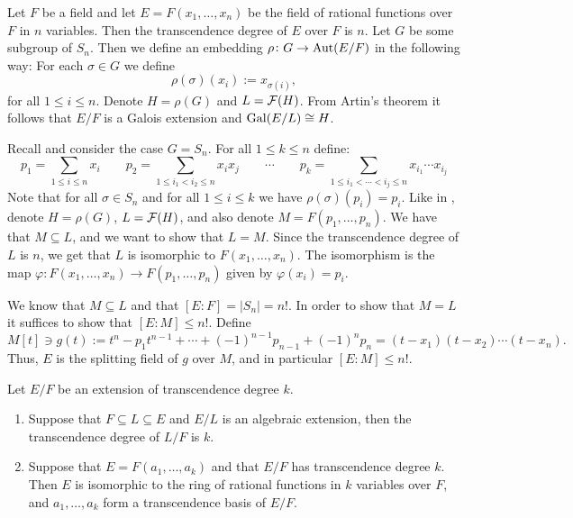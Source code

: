 \documentclass[11pt,a4paper]{article}
\begin{document}
\begin{example}
  \label{exmp:transcendence}
  Let $F$ be a field and let $E = F(x_1,\dots,x_n)$
  be the field of rational functions over $F$ in $n$ variables.
  Then the transcendence degree of $E$ over $F$ is $n$.
  Let $G$ be some subgroup of $S_n$.
  Then we define an embedding $\rho \colon G \to \operatorname{Aut}(E/F)$
  in the following way:
  For each $\sigma \in G$ we define
  \[
    \rho(\sigma)(x_i) := x_{\sigma(i)},
  \]
  for all $1 \le i \le n$.
  Denote $H = \rho(G)$ and $L = \mathcal F(H)$.
  From Artin's theorem it follows that $E/F$ is a Galois extension
  and $\operatorname{Gal}(E/L) \cong H$.
\end{example}

\begin{example}
  Recall 
  and consider the case $G = S_n$.
  For all $1 \le k \le n$ define:
  \[
    p_1 = \sum_{1 \le i \le n} x_i \qquad
    p_2 = \sum_{1 \le i_1 < i_2 \le n} x_i x_j \qquad
        \cdots \qquad
    p_k = \sum_{1 \le i_1 < \cdots < i_j \le n} x_{i_1} \cdots x_{i_j}
  \]
  Note that for all $\sigma \in S_n$ and for all $1 \le i \le k$
  we have $\rho(\sigma)(p_i) = p_i$.
  Like in ,
  denote $H = \rho(G)$, $L = \mathcal F(H)$, and also denote $M = F(p_1,\dots,p_n)$.
  We have that $M \subseteq L$,
  and we want to show that $L = M$.
  Since the transcendence degree
  of $L$ is $n$, we get that $L$ is isomorphic to $F(x_1,\dots,x_n)$.
  The isomorphism is the map
  $\varphi \colon F(x_1,\dots,x_n) \to F(p_1,\dots,p_n)$
  given by $\varphi(x_i) = p_i$.

  We know that $M \subseteq L$ and that $[E : F] = |S_n| = n!$.
  In order to show that $M = L$ it suffices to show that $[E : M] \le n!$.
  Define
  \[
    M[t] \ni g(t) :=
    t^n - p_1 t^{n-1} + \cdots + (-1)^{n-1} p_{n-1} + (-1)^n p_n =
    (t - x_1) (t - x_2) \cdots (t - x_n).
  \]
  Thus, $E$ is the splitting field of $g$ over $M$,
  and in particular $[E : M] \le n!$.
\end{example}

\begin{exercise}
  Let $E/F$ be an extension of transcendence degree $k$.
  \begin{enumerate}
    \item[(1)] Suppose that $F \subseteq L \subseteq E$
      and $E/L$ is an algebraic extension,
      then the transcendence degree of $L/F$ is $k$.
    \item[(2)] Suppose that $E = F(a_1,\dots,a_k)$ and that $E/F$
      has transcendence degree $k$.
      Then $E$ is isomorphic to the ring of rational functions in $k$
      variables over $F$, and $a_1,\dots,a_k$ form a transcendence basis
      of $E/F$.
  \end{enumerate}
\end{exercise}
\end{document}
